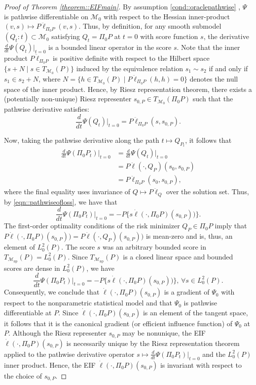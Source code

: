 \documentclass[11pt]{article}
\theoremstyle{definition}
\begin{document}
\begin{proof}[Proof of Theorem \ref{theorem::EIFmain}]
By assumption \ref{cond::oraclepathwise} , $\Psi$ is pathwise differentiable on $\mathcal{M}_0$ with respect to the Hessian inner-product $(v,s) \mapsto P\ddot{\ell}_{\Pi_0 P}(v, s) $. Thus, by definition, for any smooth submodel $(Q_t : t) \subset \mathcal{M}_0$ satisfying $Q_t = \Pi_0 P$ at $t = 0$ with score function $s$, the derivative $\frac{d}{dt} \Psi(Q_t) \Big|_{t=0}$ is a bounded linear operator in the score $s$. Note that the inner product $P\ddot{\ell}_{\Pi_0 P}$ is positive definite with respect to the Hilbert space $\{s + N \mid s \in T_{\mathcal{M}_0}(P)\}$ induced by the equivalence relation $s_1 \sim s_2$ if and only if $s_1 \in s_2 + N$, where $N = \{h \in T_{\mathcal{M}_0}(P) \mid P\ddot{\ell}_{\Pi_0 P}(h, h) = 0\}$ denotes the null space of the inner product. Hence, by Riesz representation theorem, there exists a (potentially non-unique) Riesz representer $s_{0,P} \in T_{\mathcal{M}_0}(\Pi_0 P)$ such that the pathwise derivative satisfies:
\[
\frac{d}{dt} \Psi(Q_t) \Big|_{t=0} = P\ddot{\ell}_{\Pi_0 P}(s, s_{0,P}).
\]

Now, taking the pathwise derivative along the path $t \mapsto Q_{P_t}$, it follows that
\begin{align*}
    \frac{d}{dt} \Psi(\Pi_0 P_t) \big|_{t = 0} &=   \frac{d}{dt} \Psi(Q_t) \big|_{t = 0} \\
    &= P \ddot{\ell}(\cdot, Q_P)(s_{0}, s_{0,P})\\
    &= P \ddot{\ell}_{\Pi_0 P}(s_{0}, s_{0,P}),
\end{align*}
where the final equality uses invariance of $Q \mapsto P \ddot{\ell}_{Q} $ over the solution set. Thus, by \eqref{eqn::pathwiseofloss}, we have that
$$\frac{d}{dt} \Psi(\Pi_0 P_t) \big|_{t = 0} =  -  P \{s \dot{\ell}(\cdot,  \Pi_0 P)(s_{0,P}))\}.$$
The first-order optimality conditions of the risk minimizer $Q_P \in \Pi_0 P$ imply that $P\dot{\ell}(\cdot, \Pi_0 P)(s_{0,P})) = P\dot{\ell}(\cdot, Q_P)(s_{0,P}))$ is mean-zero and is, thus, an element of $L^2_0(P)$. The score $s$ was an arbitrary bounded score in $T_{\mathcal{M}_{\mathrm{np}}}(P) = L^2_0(P)$. Since $T_{\mathcal{M}_{\mathrm{np}}}(P)$ is a closed linear space and bounded scores are dense in $L^2_0(P)$, we have 
$$\frac{d}{dt} \Psi(\Pi_0 P_t) \big|_{t = 0} =  -  P \{s \dot{\ell}(\cdot,  \Pi_0 P)(s_{0,P}))\},\, \forall s \in L^2_0(P).$$
Consequently, we conclude that $\dot{\ell}(\cdot, \Pi_0 P)(s_{0,P})$ is a gradient of $\Psi_0$ with respect to the nonparametric statistical model and that $\Psi_0$ is pathwise differentiable at $P$. Since $\dot{\ell}(\cdot, \Pi_0 P)(s_{0,P})$ is an element of the tangent space, it follows that it is the canonical gradient (or efficient influence function) of $\Psi_0$ at $P$. Although the Riesz representer $s_{0,P}$ may be nonunique, the EIF $\dot{\ell}(\cdot, \Pi_0 P)(s_{0,P})$ is necessarily unique by the Riesz representation theorem applied to the pathwise derivative operator $s \mapsto \frac{d}{dt} \Psi(\Pi_0 P_t) \big|_{t = 0}$ and the $L^2_0(P)$ inner product. Hence, the EIF $\dot{\ell}(\cdot, \Pi_0 P)(s_{0,P})$ is invariant with respect to the choice of $s_{0,P}$.




\end{proof}
\end{document}
